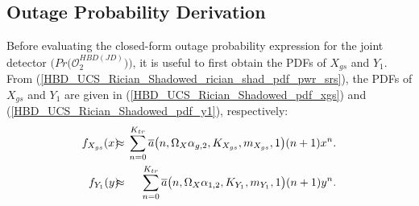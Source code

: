\subsection{Outage Probability Derivation}
Before evaluating the closed-form outage probability expression for the joint detector $\big(Pr\big(\mathcal{O}_{2}^{HBD(JD)}\big)\big)$, it is useful to first obtain the PDFs of $X_{gs}$ and $Y_1$. From (\ref{HBD_UCS_Rician_Shadowed_rician_shad_pdf_pwr_srs}), the PDFs of $X_{gs}$ and $Y_1$ are given in (\ref{HBD_UCS_Rician_Shadowed_pdf_xgs}) and (\ref{HBD_UCS_Rician_Shadowed_pdf_y1}), respectively:
\begin{eqnarray} 
f_{X_{gs}}(x) \hspace{-0.2cm} & \approx & \hspace{-0.2cm} \sum_{n=0}^{K_{tr}} \overline{a}\big(n,\Omega_X\alpha_{g,2},K_{X_{gs}},m_{X_{gs}},1\big)(n+1) x^n. \label{HBD_UCS_Rician_Shadowed_pdf_xgs} \\
f_{Y_1}(y) \hspace{-0.2cm} & \approx & \hspace{-0.2cm} \sum_{n=0}^{K_{tr}} \overline{a}\big(n,\Omega_X\alpha_{1,2},K_{Y_1},m_{Y_1},1\big)(n+1) y^n. \label{HBD_UCS_Rician_Shadowed_pdf_y1}
\end{eqnarray}

